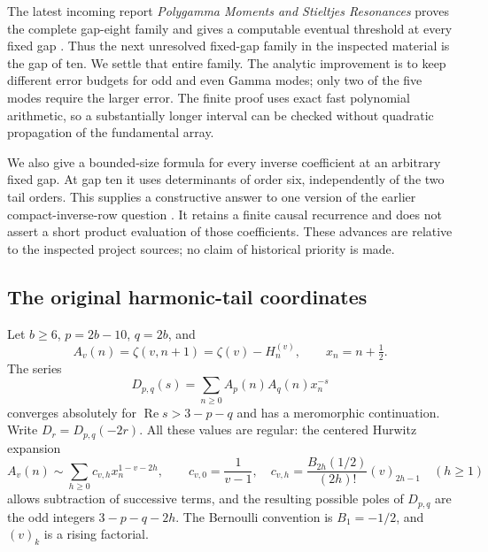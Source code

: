 \documentclass[11pt,a4paper]{article}
\theoremstyle{definition}
\theoremstyle{remark}
\numberwithin{equation}{section}
\begin{document}
The latest incoming report \emph{Polygamma Moments and Stieltjes
Resonances} proves the complete gap-eight family and gives a computable
eventual threshold at every fixed gap \cite{PolygammaResonances}.
Thus the next unresolved fixed-gap family in the inspected material is
the gap of ten. We settle that entire family. The analytic improvement
is to keep different error budgets for odd and even Gamma modes; only
two of the five modes require the larger error. The finite proof uses
exact fast polynomial arithmetic, so a substantially longer interval
can be checked without quadratic propagation of the fundamental array.

We also give a bounded-size formula for every inverse coefficient at
an arbitrary fixed gap. At gap ten it uses determinants of order six,
independently of the two tail orders. This supplies a constructive
answer to one version of the earlier compact-inverse-row question
\cite{BilinearTails}. It retains a finite causal recurrence and does
not assert a short product evaluation of those coefficients.
These advances are relative to the inspected project sources; no
claim of historical priority is made.

\subsection{The original harmonic-tail coordinates}

Let $b\ge6$, $p=2b-10$, $q=2b$, and
\[
 A_v(n)=\zeta(v,n+1)=\zeta(v)-H_n^{(v)},\qquad x_n=n+\tfrac12.
\]
The series
\[
 D_{p,q}(s)=\sum_{n\ge0} A_p(n)A_q(n)x_n^{-s}
\]
converges absolutely for $\operatorname{Re}s>3-p-q$ and has a
meromorphic continuation. Write $D_r=D_{p,q}(-2r)$.
All these values are regular: the centered Hurwitz expansion
\begin{equation}\label{gt:tail-expansion}
 A_v(n)\sim\sum_{h\ge0}c_{v,h}x_n^{1-v-2h},\qquad
 c_{v,0}=\frac1{v-1},\quad
 c_{v,h}=\frac{B_{2h}(1/2)}{(2h)!}(v)_{2h-1}\quad(h\ge1)
\end{equation}
allows subtraction of successive terms, and the resulting possible
poles of $D_{p,q}$ are the odd integers $3-p-q-2h$.
The Bernoulli convention is $B_1=-1/2$, and $(v)_k$ is a rising factorial.
\end{document}
